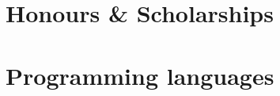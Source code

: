 \documentclass[11pt,a4paper,sans]{moderncv} %
\begin{document}
\section{Honours \& Scholarships}



\section{Programming languages}



%


%


%
%
\end{document}
